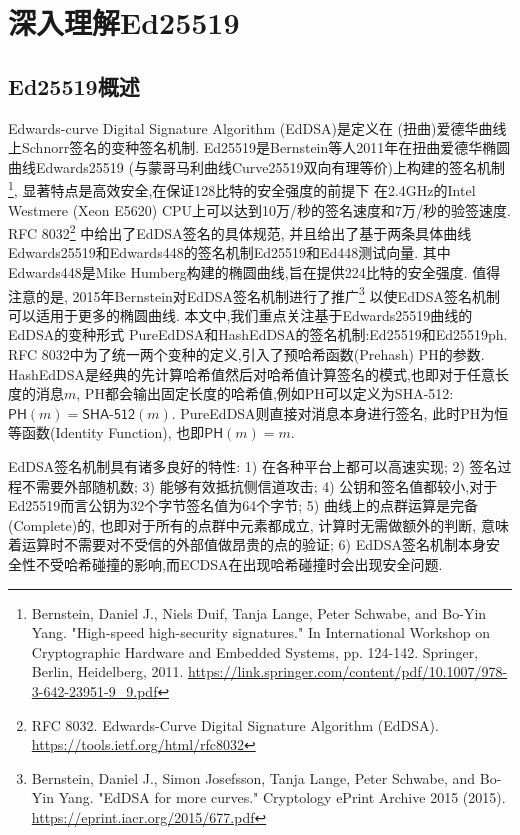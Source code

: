 \section{深入理解Ed25519}

\subsection{Ed25519概述}

Edwards-curve Digital Signature Algorithm (EdDSA)是定义在
(扭曲)爱德华曲线上Schnorr签名的变种签名机制.
Ed25519是Bernstein等人2011年在扭曲爱德华椭圆曲线Edwards25519 
(与蒙哥马利曲线Curve25519双向有理等价)上构建的签名机制\footnote{
Bernstein, Daniel J., Niels Duif, Tanja Lange, Peter Schwabe, and Bo-Yin Yang. 
"High-speed high-security signatures." 
In International Workshop on Cryptographic Hardware and Embedded Systems, 
pp. 124-142. Springer, Berlin, Heidelberg, 2011.
\url{https://link.springer.com/content/pdf/10.1007/978-3-642-23951-9_9.pdf}},
显著特点是高效安全,在保证128比特的安全强度的前提下
在2.4GHz的Intel Westmere (Xeon E5620) CPU上可以达到10万/秒的签名速度和7万/秒的验签速度.
RFC 8032\footnote{
RFC 8032. Edwards-Curve Digital Signature Algorithm (EdDSA).
\url{https://tools.ietf.org/html/rfc8032}}
中给出了EdDSA签名的具体规范,
并且给出了基于两条具体曲线Edwards25519和Edwards448的签名机制Ed25519和Ed448测试向量.
其中Edwards448是Mike Humberg构建的椭圆曲线,旨在提供224比特的安全强度.
值得注意的是, 2015年Bernstein对EdDSA签名机制进行了推广\footnote{
Bernstein, Daniel J., Simon Josefsson, Tanja Lange, Peter Schwabe, and Bo-Yin Yang. 
"EdDSA for more curves." Cryptology ePrint Archive 2015 (2015).
\url{https://eprint.iacr.org/2015/677.pdf}}
以使EdDSA签名机制可以适用于更多的椭圆曲线.
本文中,我们重点关注基于Edwards25519曲线的EdDSA的变种形式
\textsf{PureEdDSA}和\textsf{HashEdDSA}的签名机制:\textsf{Ed25519}和\textsf{Ed25519ph}.
RFC 8032中为了统一两个变种的定义,引入了预哈希函数(Prehash) \textsf{PH}的参数.
HashEdDSA是经典的先计算哈希值然后对哈希值计算签名的模式,也即对于任意长度的消息$m$,
\textsf{PH}都会输出固定长度的哈希值,例如\textsf{PH}可以定义为\textsf{SHA-512}: 
$\textsf{PH}(m) = \textsf{SHA-512}(m)$. PureEdDSA则直接对消息本身进行签名,
此时\textsf{PH}为恒等函数(Identity Function), 也即$\textsf{PH}(m) = m$.

EdDSA签名机制具有诸多良好的特性: 
1) 在各种平台上都可以高速实现; 2) 签名过程不需要外部随机数; 3) 能够有效抵抗侧信道攻击;
4) 公钥和签名值都较小,对于Ed25519而言公钥为32个字节签名值为64个字节;
5) 曲线上的点群运算是完备(Complete)的, 也即对于所有的点群中元素都成立, 计算时无需做额外的判断, 
意味着运算时不需要对不受信的外部值做昂贵的点的验证; 
6) EdDSA签名机制本身安全性不受哈希碰撞的影响,而ECDSA在出现哈希碰撞时会出现安全问题.

